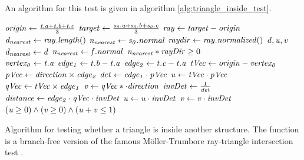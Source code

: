 An algorithm for this  test is given in algorithm \ref{alg:triangle_inside_test}. 
%
\begin{algorithm}
	\centering
	\begin{algorithmic}[1]
			\State $\mathit{origin} \gets \frac{\mathit{t.a} + \mathit{t.b} + \mathit{t.c}}{3}$ 
			\State $\mathit{target} \gets \frac{\mathit{s_0.a} + \mathit{s_0.b} + \mathit{s_0.c}}{3}$ 
			\State $\mathit{ray} \gets \mathit{target} - \mathit{origin}$
			\State $\mathit{d_{nearest}} \gets \mathit{ray.length}()$
			\State $\mathit{n_{nearest}} \gets \mathit{s_0.normal}$
			\State $\mathit{raydir} \gets \mathit{ray.normalized()}$
			 
				\State $\mathit{d}, \mathit{u}, \mathit{v}$
						\State $\mathit{d_{nearest}} \gets \mathit{d}$
						\State $\mathit{n_{nearest}} \gets \mathit{f.normal}$
					\EndIf
				\EndIf
			\EndFor
			\State \Return $\mathit{n_{nearest}} * \mathit{rayDir} \geq 0$
		\EndFunction
		\\
			\State $\mathit{vertex_0} \gets \mathit{t.a}$
			\State $\mathit{edge_1} \gets \mathit{t.b} - \mathit{t.a}$
			\State $\mathit{edge_2} \gets \mathit{t.c} - \mathit{t.a}$
			\State $\mathit{tVec} \gets \mathit{origin} - \mathit{vertex_0}$
			\State $\mathit{pVec} \gets \mathit{direction} \times \mathit{edge_2}$
			\State $\mathit{det} \gets \mathit{edge_1} \cdot \mathit{pVec}$
			\State $\mathit{u} \gets \mathit{tVec} \cdot \mathit{pVec}$
			\State $\mathit{qVec} \gets \mathit{tVec} \times \mathit{edge_1}$
			\State $\mathit{v} \gets \mathit{qVec} *\cdot \mathit{direction}$
			\State $\mathit{invDet} \gets \frac{1}{\mathit{det}}$
			\State $\mathit{distance} \gets \mathit{edge_2} \cdot \mathit{qVec} \cdot \mathit{invDet}$
			\State $\mathit{u} \gets \mathit{u} \cdot \mathit{invDet}$
			\State $\mathit{v} \gets \mathit{v} \cdot \mathit{invDet}$
			\State \Return $(\mathit{u} \geq 0) \wedge (\mathit{v} \geq 0) \wedge (\mathit{u} + \mathit{v} \leq 1)$
		\EndFunction
	\end{algorithmic}
	\caption{
		Algorithm for testing whether a triangle is inside another structure.
		The  function is a branch-free version of the famous Möller-Trumbore ray-triangle intersection test \cite{ray_triangle_intersection_moller}.
	}
	\label{alg:triangle_inside_test}
\end{algorithm}
